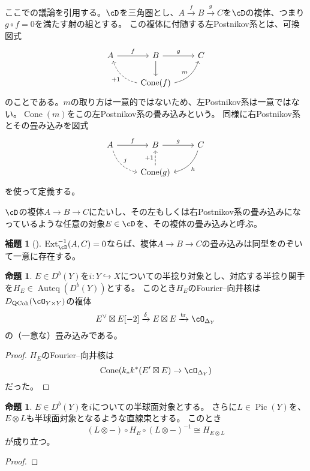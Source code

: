 \documentclass[uplatex, a4paper, dvipdfmx]{jsarticle}
\theoremstyle{definition}
\newtheorem{proposition}[theorem]{命題}
\newtheorem{lemma}[theorem]{補題}
\DeclareMathOperator{\Auteq}{\mathrm{Auteq}}
\DeclareMathOperator{\Cone}{\mathrm{Cone}}
\DeclareMathOperator{\Pic}{\mathrm{Pic}}
\DeclareMathOperator{\Ext}{\mathrm{Ext}}
\DeclareMathOperator{\QCoh}{\mathrm{QCoh}}
\DeclareMathOperator{\tr}{\mathrm{tr}}
\begin{document}
ここで{\cite{MR4452435}}の議論を引用する。$\cD$を三角圏とし、$A \xrightarrow{f} B \xrightarrow{g} C$を$\cD$の複体、つまり$g \circ f=0$を満たす射の組とする。
この複体に付随する左Postnikov系とは、可換図式
\[
    \begin{tikzcd}
        A \ar[r, "f"] & B \ar[r, "g"]\ar[d] & C \\
        & \Cone(f)\ar[lu, dashed, bend left, "+1"] \ar[ru, bend right, "m"] &
    \end{tikzcd}
\]
のことである。$m$の取り方は一意的ではないため、左Postnikov系は一意ではない。$\Cone(m)$をこの左Postnikov系の畳み込みという。
同様に右Postnikov系とその畳み込みを図式
\[
    \begin{tikzcd}
        A \ar[r, "f"] \ar[rd, bend right, dashed, "j"]& B \ar[r, "g"] & C \ar[ld, bend left, "h"] \\
        & \Cone(g)\ar[u, dashed, "+1"] &
    \end{tikzcd}
\]
を使って定義する。

$\cD$の複体$A \to B \to C$にたいし、その左もしくは右Postnikov系の畳み込みになっているような任意の対象$E \in \cD$を、その複体の畳み込みと呼ぶ。
\begin{lemma}[{\cite{MR4452435}}]
    $\Ext^{-1}_{\cD}(A, C) = 0$ならば、複体$A \to B \to C$の畳み込みは同型をのぞいて一意に存在する。
\end{lemma}


\begin{proposition}
    $E \in D^b(Y)$を$i \colon Y \hookrightarrow X$についての半捻り対象とし、対応する半捻り関手を$H_E \in \Auteq(D^b(Y))$とする。
    このとき$H_E$のFourier--向井核は$D_{\QCoh}(\cO_{Y \times Y})$の複体
    \begin{equation}
        E^\vee \boxtimes E[-2] \xrightarrow{\delta} E\boxtimes E \xrightarrow{\tr} \cO_{\Delta_Y}
    \end{equation}
    の（一意な）畳み込みである。
\end{proposition}
\begin{proof}
    $H_E$のFourier--向井核は
    \begin{equation}
        \Cone(k_*k^*(E' \boxtimes E) \to \cO_{\Delta_Y})
    \end{equation}
    だった。
\end{proof}

\begin{proposition}
    $E \in D^b(Y)$を$i$についての半球面対象とする。
    さらに$L \in \Pic(Y)$を、$E \otimes L$も半球面対象となるような直線束とする。
    このとき
    \begin{equation}
        (L \otimes -) \circ H_E \circ (L \otimes -)^{-1} \cong H_{E\otimes L}
    \end{equation}
    が成り立つ。
\end{proposition}
\begin{proof}
\end{proof}
\printbibliography[title=参考文献]
\end{document}
